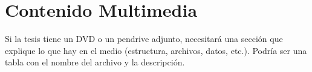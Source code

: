 \chapter{Contenido Multimedia}

Si la tesis tiene un DVD o un pendrive adjunto, necesitará una sección que explique lo que hay en el medio (estructura, archivos, datos, etc.).  Podría ser una tabla con el nombre del archivo y la descripción.

\blindtext
